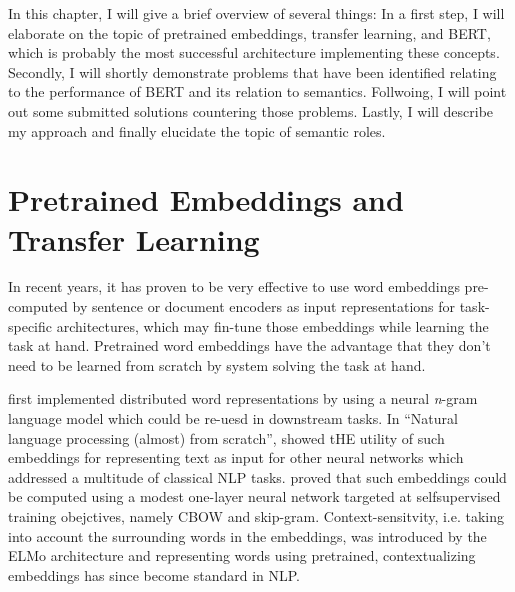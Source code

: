\label{chap:2_approach}



In this chapter, I will give a brief overview of several things: In a first step, I will
elaborate on the topic of pretrained embeddings, transfer learning, and BERT, which is
probably the most successful architecture implementing these concepts. Secondly, I will
shortly demonstrate problems that have been identified relating to the performance of
BERT and its relation to semantics. Follwoing, I will point out some submitted solutions
countering those problems. Lastly, I will describe my approach and finally elucidate the
topic of semantic roles.



\section{Pretrained Embeddings and Transfer Learning}
\label{sec:pretrained-embeddings}

In recent years, it has proven to be very effective to use word embeddings pre-computed by sentence
or document encoders as input representations for task-specific architectures, which may fin-tune
those embeddings while learning the task at hand. Pretrained word embeddings have the advantage
that they don't need to be learned from scratch by system solving the task at hand.


\cite{bengio2003neural} first implemented distributed word representations by using a neural
\textit{n}-gram language model which could be re-uesd in downstream tasks. In ``Natural language
processing (almost) from scratch'', \cite{collobert2011natural} showed tHE utility of such
embeddings for representing text as input for other neural networks which addressed a multitude
of classical NLP tasks. \cite{mikolov2013distributed} proved that such embeddings could be
computed using a modest one-layer neural network targeted at selfsupervised training obejctives,
namely CBOW and skip-gram. Context-sensitvity, i.e. taking into account the surrounding words in
the embeddings, was introduced by the ELMo architecture \cite{peng2019transfer} and representing
words using pretrained, contextualizing embeddings has since become standard in NLP.



